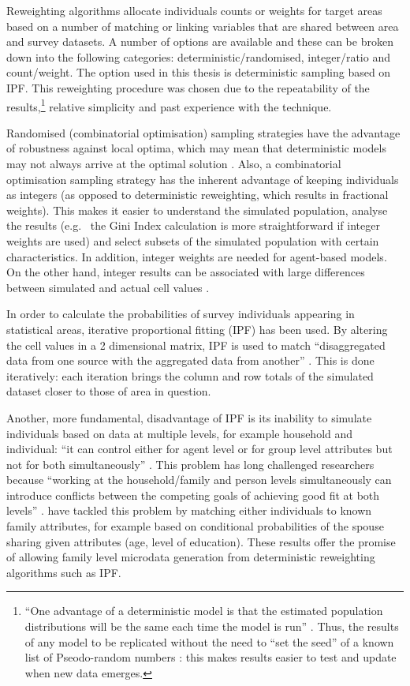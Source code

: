 Reweighting algorithms allocate individuals counts or weights for target
areas based on a number of matching or linking variables that are shared between
area and survey datasets. A number of options are available and these can be
broken down into the following categories:
deterministic/randomised, integer/ratio and count/weight.
The option used in this thesis is deterministic
sampling based on IPF. This reweighting procedure was
chosen due to the repeatability of the
results,\footnote{``One
advantage of a deterministic model is that the estimated population
distributions will be the same each time the model is run'' \citep{Smith2009}⁠.
Thus, the results of any model to be replicated
without the need to ``set the seed'' of a known list of
Pseodo-random numbers \citep{Robert2009}: this makes results easier to
test and update when new data emerges.}
relative simplicity and past experience with
the technique.

Randomised (combinatorial optimisation) sampling strategies have the advantage
of robustness against local
optima, which may mean that deterministic models may not always arrive at the
optimal solution \citep{Williamson1998}.
Also, a combinatorial optimisation sampling strategy has the inherent advantage of
keeping individuals as integers (as opposed to deterministic reweighting,
which results in fractional weights). This makes it easier to
understand the simulated population, analyse the results 
(e.g.~ the Gini Index calculation
is more straightforward if integer weights are used) and select
subsets of the simulated population with certain characteristics.
In addition, integer weights are needed for agent-based models. On the other
hand, integer results can be associated with large differences between simulated
and actual cell values \citep{Ballas2005}⁠.

In order to calculate the probabilities of survey individuals appearing in
statistical areas, iterative proportional fitting (IPF) has been used. By
altering the cell values in a 2 dimensional matrix, IPF is used to match
``disaggregated data from one source with the aggregated data from another''
\citep[p.~1]{Norman1999a}⁠. This is done iteratively: each iteration brings the column and
row totals of the simulated dataset closer to those of area in question.

Another, more fundamental, disadvantage of IPF is its inability to simulate
individuals based on data at multiple levels, for example household and
individual: ``it can control either for agent level or for group level
attributes but not for both simultaneously'' \citep[p.~5]{Muller2010}.
This problem has long challenged researchers because ``working at the
household/family and person levels simultaneously can introduce conflicts
between the competing goals of achieving good fit at both levels''
\citet[p.~694]{Pritchard2012}. \citet{Pritchard2012} have tackled this problem
by matching either individuals to known family attributes, for example 
based on conditional probabilities of the spouse sharing given
attributes (age, level of education). These results offer the promise of allowing
family level microdata generation from deterministic reweighting algorithms
such as IPF.

